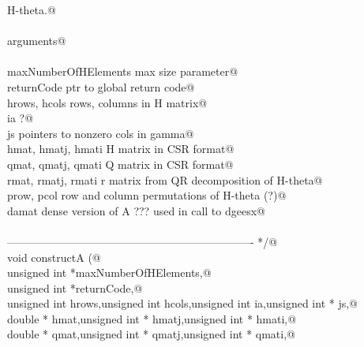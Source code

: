 \documentclass[12pt]{article}
\begin{document}
\begin{flushleft}
\begin{minipage}{\linewidth}
\begin{list}{}{}
\mbox{}\verb@        H-theta.@\\
\mbox{}\verb@@\\
\mbox{}\verb@        arguments@\\
\mbox{}\verb@@\\
\mbox{}\verb@                maxNumberOfHElements                    max size parameter@\\
\mbox{}\verb@                returnCode                                              ptr to global return code@\\
\mbox{}\verb@                hrows, hcols                                    rows, columns in H matrix@\\
\mbox{}\verb@                ia                                                              ?@\\
\mbox{}\verb@                js                                                              pointers to nonzero cols in gamma@\\
\mbox{}\verb@                hmat, hmatj, hmati                              H matrix in CSR format@\\
\mbox{}\verb@                qmat, qmatj, qmati                              Q matrix in CSR format@\\
\mbox{}\verb@                rmat, rmatj, rmati                              r matrix from QR decomposition of H-theta@\\
\mbox{}\verb@                prow, pcol                                              row and column permutations of H-theta (?)@\\
\mbox{}\verb@                damat                                                   dense version of A ??? used in call to dgeesx@\\
\mbox{}\verb@@\\
\mbox{}\verb@------------------------------------------------------------------- */@\\
\mbox{}\verb@static void constructA (@\\
\mbox{}\verb@        unsigned int *maxNumberOfHElements,@\\
\mbox{}\verb@        unsigned int *returnCode,@\\
\mbox{}\verb@        unsigned int hrows,unsigned int hcols,unsigned int ia,unsigned int * js,@\\
\mbox{}\verb@        double * hmat,unsigned int * hmatj,unsigned int * hmati,@\\
\mbox{}\verb@        double * qmat,unsigned int * qmatj,unsigned int * qmati,@\\

\end{list}
\end{minipage}
\end{flushleft}
\end{document}
